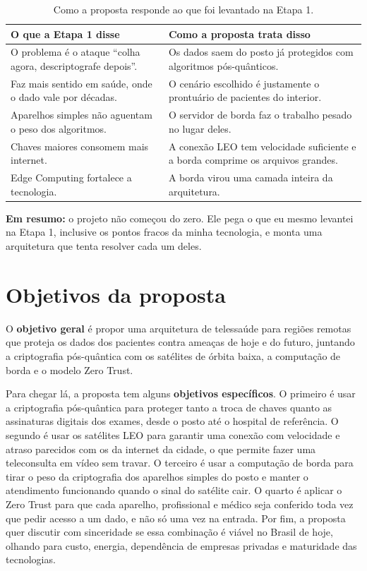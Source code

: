 \documentclass[12pt,a4paper]{article}
\newcommand{\fonte}[1]{\par\vspace{3pt}{\centering\footnotesize Fonte: #1\par}}
\newcommand{\resumo}[1]{\begin{emresumo}\textbf{\color{azul}Em resumo:} #1\end{emresumo}}
\begin{document}
\begin{table}[H]
\centering
\caption{Como a proposta responde ao que foi levantado na Etapa 1.}
\label{tab:etapa1}
\small
\renewcommand{\arraystretch}{1.3}
\begin{tabularx}{\textwidth}{>{\raggedright\arraybackslash}p{4.4cm} >{\raggedright\arraybackslash}X}
\toprule
\textbf{O que a Etapa 1 disse} & \textbf{Como a proposta trata disso} \\
\midrule
O problema é o ataque ``colha agora, descriptografe depois''. & Os dados saem do posto já protegidos com algoritmos pós-quânticos. \\
Faz mais sentido em saúde, onde o dado vale por décadas. & O cenário escolhido é justamente o prontuário de pacientes do interior. \\
Aparelhos simples não aguentam o peso dos algoritmos. & O servidor de borda faz o trabalho pesado no lugar deles. \\
Chaves maiores consomem mais internet. & A conexão LEO tem velocidade suficiente e a borda comprime os arquivos grandes. \\
Edge Computing fortalece a tecnologia. & A borda virou uma camada inteira da arquitetura. \\
\bottomrule
\end{tabularx}
\fonte{elaborada pelo autor (2026).}
\end{table}

\resumo{o projeto não começou do zero. Ele pega o que eu mesmo levantei na Etapa 1, inclusive os pontos fracos da minha tecnologia, e monta uma arquitetura que tenta resolver cada um deles.}

\section{Objetivos da proposta}

O \textbf{objetivo geral} é propor uma arquitetura de telessaúde para regiões remotas que proteja os dados dos pacientes contra ameaças de hoje e do futuro, juntando a criptografia pós-quântica com os satélites de órbita baixa, a computação de borda e o modelo Zero Trust.

Para chegar lá, a proposta tem alguns \textbf{objetivos específicos}. O primeiro é usar a criptografia pós-quântica para proteger tanto a troca de chaves quanto as assinaturas digitais dos exames, desde o posto até o hospital de referência. O segundo é usar os satélites LEO para garantir uma conexão com velocidade e atraso parecidos com os da internet da cidade, o que permite fazer uma teleconsulta em vídeo sem travar. O terceiro é usar a computação de borda para tirar o peso da criptografia dos aparelhos simples do posto e manter o atendimento funcionando quando o sinal do satélite cair. O quarto é aplicar o Zero Trust para que cada aparelho, profissional e médico seja conferido toda vez que pedir acesso a um dado, e não só uma vez na entrada. Por fim, a proposta quer discutir com sinceridade se essa combinação é viável no Brasil de hoje, olhando para custo, energia, dependência de empresas privadas e maturidade das tecnologias.
\end{document}
